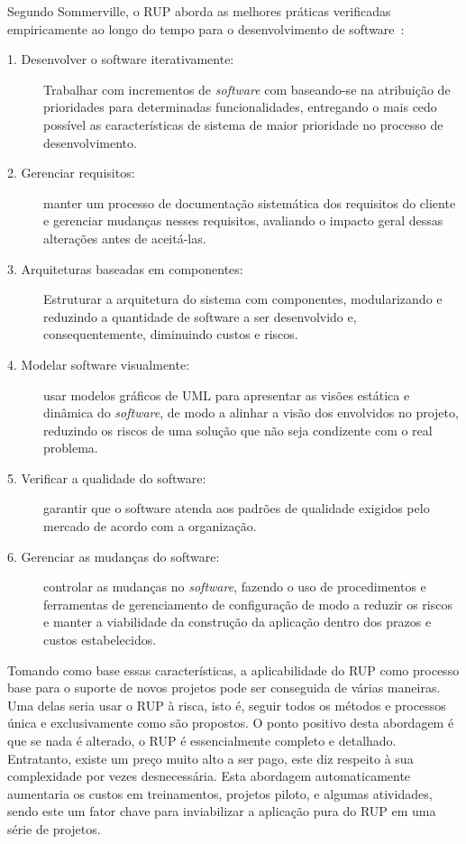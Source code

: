 Segundo Sommerville, o RUP aborda as melhores práticas verificadas empiricamente ao longo do tempo para o desenvolvimento de software~\cite{sommerville}:

\begin{description}
\item[1. Desenvolver o software iterativamente:] Trabalhar com incrementos de \textit{software} com baseando-se na atribuição de prioridades para determinadas funcionalidades, entregando o mais cedo possível as características de sistema de maior prioridade no processo de desenvolvimento.
\item[2. Gerenciar requisitos:] manter um processo de documentação sistemática dos requisitos do cliente e gerenciar mudanças nesses requisitos, avaliando o impacto geral dessas alterações antes de aceitá-las.
\item[3. Arquiteturas baseadas em componentes:] Estruturar a arquitetura do sistema com componentes, modularizando e reduzindo a quantidade de software a ser desenvolvido e, consequentemente, diminuindo custos e riscos.
\item[4. Modelar software visualmente:] usar modelos gráficos de UML para apresentar as visões estática e dinâmica do \textit{software}, de modo a alinhar a visão dos envolvidos no projeto, reduzindo os riscos de uma solução que não seja condizente com o real problema.
\item[5. Verificar a qualidade do software:] garantir que o software atenda aos padrões de qualidade exigidos pelo mercado de acordo com a organização.
\item[6. Gerenciar as mudanças do software:] controlar as mudanças no \textit{software}, fazendo o uso de procedimentos e ferramentas de gerenciamento de configuração de modo a reduzir os riscos e manter a viabilidade da construção da aplicação dentro dos prazos e custos estabelecidos.
\end{description}

Tomando como base essas características, a aplicabilidade do RUP como processo base para o suporte de novos projetos pode ser conseguida de várias maneiras. Uma delas seria usar o RUP à risca, isto é, seguir todos os métodos e processos única e exclusivamente como são propostos. O ponto positivo desta abordagem é que se nada é alterado, o RUP é essencialmente completo e detalhado. Entratanto, existe um preço muito alto a ser pago, este diz respeito à sua complexidade por vezes desnecessária. Esta abordagem automaticamente aumentaria os custos em treinamentos, projetos piloto, e algumas atividades, sendo este um fator chave para inviabilizar a aplicação pura do RUP em uma série de projetos.

